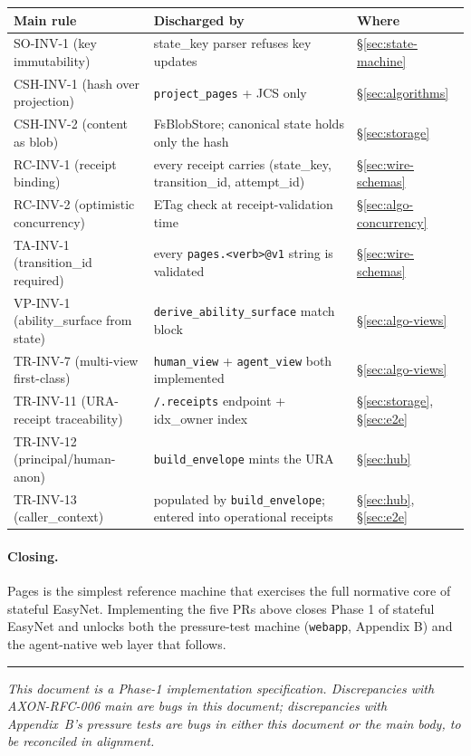 \documentclass[11pt,a4paper]{article}
\theoremstyle{definition}
\begin{document}
\begin{center}
\renewcommand{\arraystretch}{1.2}
\begin{tabularx}{\linewidth}{l X l}
\toprule
\textbf{Main rule} & \textbf{Discharged by} & \textbf{Where} \\
\midrule
SO-INV-1 (key immutability)              & state\_key parser refuses key updates                 & \S\ref{sec:state-machine} \\
CSH-INV-1 (hash over projection)         & \texttt{project\_pages} + JCS only                     & \S\ref{sec:algorithms} \\
CSH-INV-2 (content as blob)              & FsBlobStore; canonical state holds only the hash       & \S\ref{sec:storage} \\
RC-INV-1 (receipt binding)               & every receipt carries (state\_key, transition\_id, attempt\_id) & \S\ref{sec:wire-schemas} \\
RC-INV-2 (optimistic concurrency)        & ETag check at receipt-validation time                  & \S\ref{sec:algo-concurrency} \\
TA-INV-1 (transition\_id required)       & every \texttt{pages.<verb>@v1} string is validated     & \S\ref{sec:wire-schemas} \\
VP-INV-1 (ability\_surface from state)   & \texttt{derive\_ability\_surface} match block          & \S\ref{sec:algo-views} \\
TR-INV-7 (multi-view first-class)        & \texttt{human\_view} + \texttt{agent\_view} both implemented & \S\ref{sec:algo-views} \\
TR-INV-11 (URA-receipt traceability)     & \texttt{/.receipts} endpoint + idx\_owner index        & \S\ref{sec:storage}, \S\ref{sec:e2e} \\
TR-INV-12 (principal/human-anon)         & \texttt{build\_envelope} mints the URA                 & \S\ref{sec:hub} \\
TR-INV-13 (caller\_context)              & populated by \texttt{build\_envelope}; entered into operational receipts & \S\ref{sec:hub}, \S\ref{sec:e2e} \\
\bottomrule
\end{tabularx}
\end{center}

\paragraph{Closing.} Pages is the simplest reference machine that
exercises the full normative core of stateful EasyNet.
Implementing the five PRs above closes Phase 1 of stateful
EasyNet and unlocks both the pressure-test machine
(\texttt{webapp}, Appendix B) and the agent-native web layer
that follows.

\vfill
\hrule
\vspace{0.4em}
\noindent\small
\textit{This document is a Phase-1 implementation specification.
Discrepancies with AXON-RFC-006 main are bugs in this document;
discrepancies with Appendix~B's pressure tests are bugs in either
this document or the main body, to be reconciled in alignment.}
\end{document}
